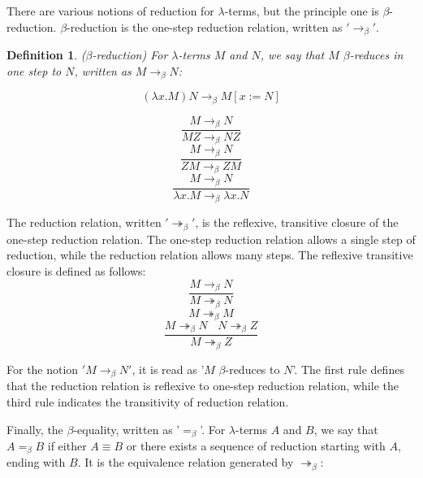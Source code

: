 \documentclass[a4paper,11pt,twoside]{report}
\newtheorem{def1}{\textbf{Definition}}[chapter]
\begin{document}
\noindent There are various notions of reduction for $\lambda$-terms, but the principle one is $\beta$-reduction. $\beta$-reduction is the one-step reduction relation, written as $'\rightarrow _\beta'$. 

\begin{def1}
($\beta$-reduction) For $\lambda$-terms $M$ and $N$, we say that $M$ $\beta$-reduces in one step to $N$, written as $M \rightarrow _\beta N$:
\end{def1}
\begin{equation*}
(\lambda x.M)N\rightarrow _\beta M[x:=N]
\end{equation*}

\begin{equation*}
\frac{M\rightarrow _\beta N}{MZ \rightarrow _\beta NZ}
\end{equation*}
\begin{equation*}
\frac{M\rightarrow _\beta N}{ZM \rightarrow _\beta ZM}
\end{equation*}
\begin{equation*}
\frac{M\rightarrow _\beta N}{\lambda x.M \rightarrow _\beta \lambda x.N}
\end{equation*}

\noindent The reduction relation, written $'\twoheadrightarrow _\beta'$, is the reflexive, transitive closure of the one-step reduction relation. The one-step reduction relation allows a single step of reduction, while the reduction relation allows many steps. The reflexive transitive closure is defined as follows:
\begin{equation*}
\frac{M\rightarrow _\beta N}{M \twoheadrightarrow _\beta N}
\end{equation*}
\begin{equation*}
M \twoheadrightarrow _\beta M
\end{equation*}
\begin{equation*}
\frac{M\twoheadrightarrow _\beta N\ \ \ \ N\twoheadrightarrow _\beta Z}{M \twoheadrightarrow _\beta Z}
\end{equation*}

For the notion $'M\rightarrow _\beta N'$, it is read as '$M$ $\beta$-reduces to $N$'. The first rule defines that the reduction relation is reflexive to one-step reduction relation, while the third rule indicates the transitivity of reduction relation.

\noindent Finally, the $\beta$-equality, written as '$=_\beta$'. For $\lambda$-terms $A$ and $B$, we say that $A =_\beta B$ if either $A \equiv B$ or there exists a sequence of reduction starting with $A$, ending with $B$. It is the equivalence relation generated by $\twoheadrightarrow _\beta$:
\end{document}
